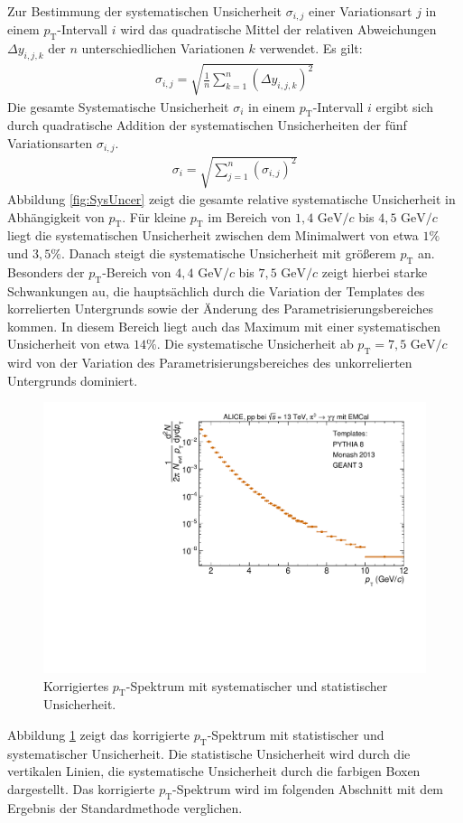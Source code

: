 Zur Bestimmung der systematischen Unsicherheit $\sigma_{i,j}$ einer Variationsart $j$ in einem $p_\text{T}$-Intervall $i$ wird das quadratische Mittel der relativen Abweichungen $\Delta y_{i,j,k}$ der $n$ unterschiedlichen Variationen $k$ verwendet.
Es gilt:
\begin{align}
\sigma_{i,j} = \sqrt{\frac{1}{n}\sum_{k=1}^{n}\left(\Delta y_{i,j,k}\right)^{2}}
\end{align}
Die gesamte Systematische Unsicherheit $\sigma_{i}$ in einem $p_\text{T}$-Intervall $i$ ergibt sich durch quadratische Addition der systematischen Unsicherheiten der fünf Variationsarten $\sigma_{i,j}$.
\begin{align}
\sigma_{i} = \sqrt{\sum_{j=1}^{n}\left(\sigma_{i,j}\right)^{2}}
\end{align}
Abbildung \ref{fig:SysUncer} zeigt die gesamte relative systematische Unsicherheit in Abhängigkeit von $p_\text{T}$.
Für kleine $p_\text{T}$ im Bereich von $1,4 \text{ GeV}/c$ bis $4,5 \text{ GeV}/c$ liegt die systematischen Unsicherheit zwischen dem Minimalwert von etwa $1\%$ und $3,5\%$.
Danach steigt die systematische Unsicherheit mit größerem $p_\text{T}$ an.
Besonders der $p_\text{T}$-Bereich von $4,4 \text{ GeV}/c$ bis $7,5 \text{ GeV}/c$ zeigt hierbei starke Schwankungen au, die hauptsächlich durch die Variation der Templates des korrelierten Untergrunds sowie der Änderung des Parametrisierungsbereiches kommen.
In diesem Bereich liegt auch das Maximum mit einer systematischen Unsicherheit von etwa $14\%$.
Die systematische Unsicherheit ab $p_\text{T} = 7,5 \text{ GeV}/c$ wird von der Variation des Parametrisierungsbereiches des unkorrelierten Untergrunds dominiert.
\begin{figure}[t!]
\centering
\includegraphics[width=.65\linewidth]{KorrigierterYield_Data_2016.pdf}
\caption{Korrigiertes $p_\text{T}$-Spektrum mit systematischer und statistischer Unsicherheit.}
\label{fig:KorrYield}
\end{figure}
\newline
Abbildung \ref{fig:KorrYield} zeigt das korrigierte $p_\text{T}$-Spektrum mit statistischer und systematischer Unsicherheit.
Die statistische Unsicherheit wird durch die vertikalen Linien, die systematische Unsicherheit durch die farbigen Boxen dargestellt.
\newline
Das korrigierte $p_\text{T}$-Spektrum wird im folgenden Abschnitt mit dem Ergebnis der Standardmethode verglichen.